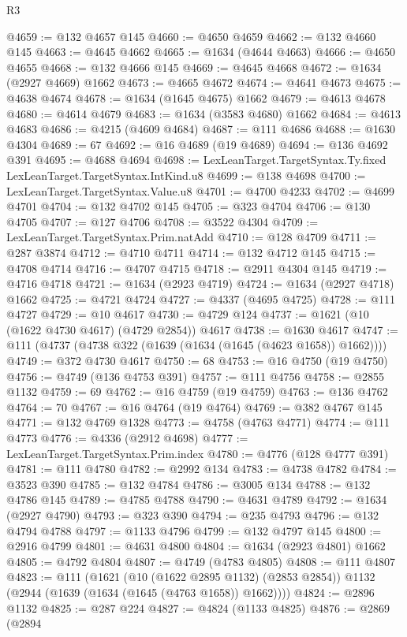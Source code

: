 \begin{lexlean}{R3}
\begin{coremodule}
@4659 := @132 @4657 @145
@4660 := @4650 @4659
@4662 := @132 @4660 @145
@4663 := @4645 @4662
@4665 := @1634 (@4644 @4663)
@4666 := @4650 @4655
@4668 := @132 @4666 @145
@4669 := @4645 @4668
@4672 := @1634 (@2927 @4669) @1662
@4673 := @4665 @4672
@4674 := @4641 @4673
@4675 := @4638 @4674
@4678 := @1634 (@1645 @4675) @1662
@4679 := @4613 @4678
@4680 := @4614 @4679
@4683 := @1634 (@3583 @4680) @1662
@4684 := @4613 @4683
@4686 := @4215 (@4609 @4684)
@4687 := @111 @4686
@4688 := @1630 @4304
@4689 := 67
@4692 := @16 @4689 (@19 @4689)
@4694 := @136 @4692 @391
@4695 := @4688 @4694
@4698 := LexLeanTarget.TargetSyntax.Ty.fixed LexLeanTarget.TargetSyntax.IntKind.u8
@4699 := @138 @4698
@4700 := LexLeanTarget.TargetSyntax.Value.u8
@4701 := @4700 @4233
@4702 := @4699 @4701
@4704 := @132 @4702 @145
@4705 := @323 @4704
@4706 := @130 @4705
@4707 := @127 @4706
@4708 := @3522 @4304
@4709 := LexLeanTarget.TargetSyntax.Prim.natAdd
@4710 := @128 @4709
@4711 := @287 @3874
@4712 := @4710 @4711
@4714 := @132 @4712 @145
@4715 := @4708 @4714
@4716 := @4707 @4715
@4718 := @2911 @4304 @145
@4719 := @4716 @4718
@4721 := @1634 (@2923 @4719)
@4724 := @1634 (@2927 @4718) @1662
@4725 := @4721 @4724
@4727 := @4337 (@4695 @4725)
@4728 := @111 @4727
@4729 := @10 @4617
@4730 := @4729 @124
@4737 := @1621 (@10 (@1622 @4730 @4617) (@4729 @2854)) @4617
@4738 := @1630 @4617
@4747 := @111 (@4737 (@4738 @322 (@1639 (@1634 (@1645 (@4623 @1658)) @1662))))
@4749 := @372 @4730 @4617
@4750 := 68
@4753 := @16 @4750 (@19 @4750)
@4756 := @4749 (@136 @4753 @391)
@4757 := @111 @4756
@4758 := @2855 @1132
@4759 := 69
@4762 := @16 @4759 (@19 @4759)
@4763 := @136 @4762
@4764 := 70
@4767 := @16 @4764 (@19 @4764)
@4769 := @382 @4767 @145
@4771 := @132 @4769 @1328
@4773 := @4758 (@4763 @4771)
@4774 := @111 @4773
@4776 := @4336 (@2912 @4698)
@4777 := LexLeanTarget.TargetSyntax.Prim.index
@4780 := @4776 (@128 @4777 @391)
@4781 := @111 @4780
@4782 := @2992 @134
@4783 := @4738 @4782
@4784 := @3523 @390
@4785 := @132 @4784
@4786 := @3005 @134
@4788 := @132 @4786 @145
@4789 := @4785 @4788
@4790 := @4631 @4789
@4792 := @1634 (@2927 @4790)
@4793 := @323 @390
@4794 := @235 @4793
@4796 := @132 @4794 @4788
@4797 := @1133 @4796
@4799 := @132 @4797 @145
@4800 := @2916 @4799
@4801 := @4631 @4800
@4804 := @1634 (@2923 @4801) @1662
@4805 := @4792 @4804
@4807 := @4749 (@4783 @4805)
@4808 := @111 @4807
@4823 := @111
    (@1621
      (@10 (@1622 @2895 @1132) (@2853 @2854))
      @1132
      (@2944 (@1639 (@1634 (@1645 (@4763 @1658)) @1662))))
@4824 := @2896 @1132
@4825 := @287 @224
@4827 := @4824 (@1133 @4825)
@4876 := @2869
    (@2894

\end{coremodule}
\end{lexlean}
